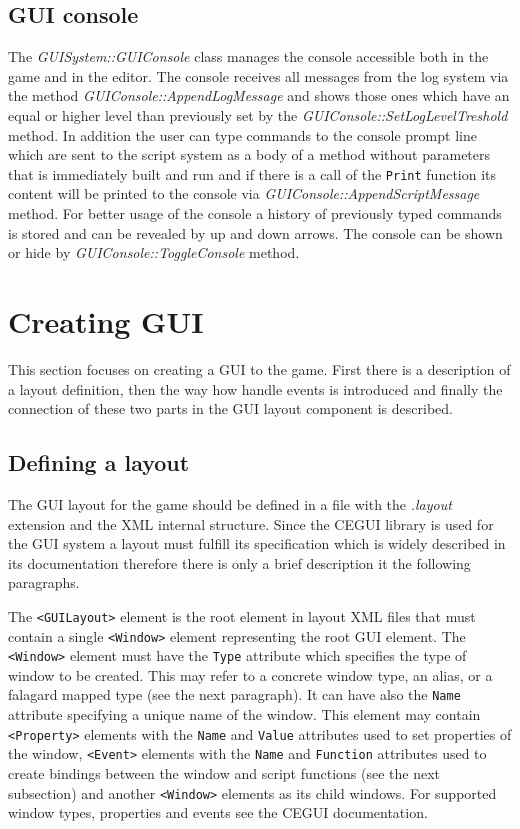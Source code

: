 \subsection{GUI console}
\label{sub:gui-console}

The \emph{GUISystem::GUIConsole} class manages the console accessible both in the game and in the editor. The console receives all messages from the log system via the method \emph{GUIConsole::AppendLogMessage} and shows those ones which have an equal or higher level than previously set by the \emph{GUIConsole::SetLogLevelTreshold} method. In addition the user can type commands to the console prompt line which are sent to the script system as a body of a method without parameters that is immediately built and run and if there is a call of the \verb/Print/ function its content will be printed to the console via \emph{GUIConsole::AppendScriptMessage} method. For better usage of the console a history of previously typed commands is stored and can be revealed by up and down arrows. The console can be shown or hide by \emph{GUIConsole::ToggleConsole} method.

\section{Creating GUI}
\label{sec:gui-creating}

This section focuses on creating a GUI to the game. First there is a description of a layout definition, then the way how handle events is introduced and finally the connection of these two parts in the GUI layout component is described.

\subsection{Defining a layout}

The GUI layout for the game should be defined in a file with the \emph{.layout} extension and the XML internal structure. Since the CEGUI library is used for the GUI system a layout must fulfill its specification which is widely described in its documentation \cite{cegui} therefore there is only a brief description it the following paragraphs.

The \verb/<GUILayout>/ element is the root element in layout XML files that must contain a single \verb/<Window>/ element representing the root GUI element. The \verb/<Window>/ element must have the \verb/Type/ attribute which specifies the type of window to be created. This may refer to a concrete window type, an alias, or a falagard mapped type (see the next paragraph). It can have also the \verb/Name/ attribute specifying a unique name of the window. This element may contain \verb/<Property>/ elements with the \verb/Name/ and \verb/Value/ attributes used to set properties of the window, \verb/<Event>/ elements with the \verb/Name/ and \verb/Function/ attributes used to create bindings between the window and script functions (see the next subsection) and another \verb/<Window>/ elements as its child windows. For supported window types, properties and events see the CEGUI documentation.

